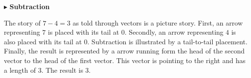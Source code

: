 \documentclass{ximera}
\begin{document}
  \begin{image}
  \end{image}















$\blacktriangleright$ \textbf{Subtraction}





The story of $7 - 4 = 3$ as told through vectors is a picture story.  First, an arrow representing $7$ is placed with its tail at $0$.  Secondly, an arrow representing $4$ is also placed with its tail at $0$.  Subtraction is illustrated by a tail-to-tail placement.  Finally, the result is represented by a arrow running form the head of the second vector to the head of the first vector. This vector is pointing to the right and has a length of $3$.  The result is $3$.
\end{document}
